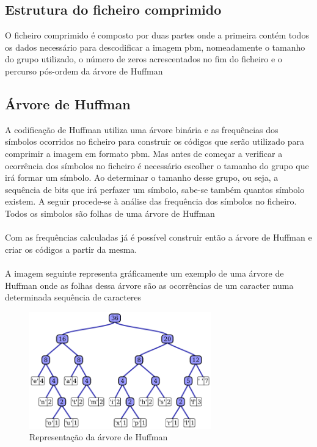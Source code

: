 \subsection{Estrutura do ficheiro comprimido}
O  ficheiro comprimido é composto por duas partes onde a primeira contém todos os dados necessário para descodificar a imagem pbm, nomeadamente o tamanho do grupo utilizado, o número de zeros acrescentados no fim do ficheiro e o percurso pós-ordem da árvore de Huffman\\
\newpage



\subsection{Árvore de Huffman}
A codificação de Huffman utiliza uma árvore binária e as frequências dos símbolos ocorridos no ficheiro para construir os códigos que serão utilizado para comprimir a imagem em formato pbm. Mas antes de começar a verificar a ocorrência dos símbolos no ficheiro é necessário escolher o tamanho do grupo que irá formar um símbolo. Ao determinar o tamanho desse grupo, ou seja, a sequência de bits que irá perfazer um símbolo, sabe-se também quantos símbolo existem. A seguir procede-se à análise das frequência dos símbolos no ficheiro. Todos os simbolos são folhas de uma árvore de Huffman\\
\\
Com as frequências calculadas já é possível construir então a árvore de Huffman e criar os códigos a partir da mesma.\\
\\
A imagem seguinte representa gráficamente um exemplo de uma árvore de Huffman onde as folhas dessa árvore são as ocorrências de um caracter numa determinada sequência de caracteres\\

\begin{figure}[h]
  \caption{Representação da árvore de Huffman}
  \centering
    \includegraphics[width=0.7\textwidth]{huffman.png}
\end{figure}



